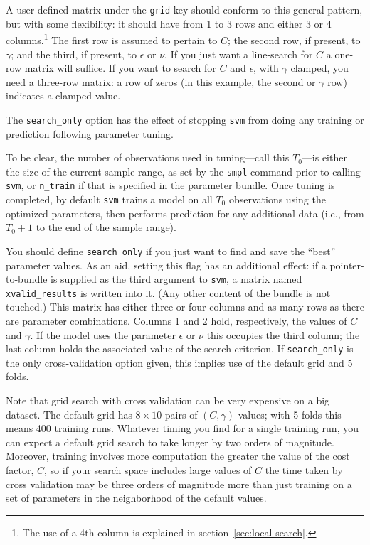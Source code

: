 \documentclass{article}
\begin{document}
A user-defined matrix under the \texttt{grid} key should conform to
this general pattern, but with some flexibility: it should have from 1
to 3 rows and either 3 or 4 columns.\footnote{The use of a 4th column
  is explained in section~\ref{sec:local-search}.} The first row is
assumed to pertain to $C$; the second row, if present, to $\gamma$;
and the third, if present, to $\epsilon$ or $\nu$. If you just want a
line-search for $C$ a one-row matrix will suffice.  If you want to
search for $C$ and $\epsilon$, with $\gamma$ clamped, you need a
three-row matrix: a row of zeros (in this example, the second or
$\gamma$ row) indicates a clamped value.

The \texttt{search\_only} option has the effect of stopping
\texttt{svm} from doing any training or prediction following parameter
tuning.

To be clear, the number of observations used in tuning---call this
$T_0$---is either the size of the current sample range, as set by the
\texttt{smpl} command prior to calling \texttt{svm}, or
\texttt{n\_train} if that is specified in the parameter bundle. Once
tuning is completed, by default \texttt{svm} trains a model on all
$T_0$ observations using the optimized parameters, then performs
prediction for any additional data (i.e., from $T_0 + 1$ to the end of
the sample range).

You should define \texttt{search\_only} if you just want to find and
save the ``best'' parameter values. As an aid, setting this flag has
an additional effect: if a pointer-to-bundle is supplied as the third
argument to \texttt{svm}, a matrix named \texttt{xvalid\_results} is
written into it. (Any other content of the bundle is not touched.)
This matrix has either three or four columns and as many rows as there
are parameter combinations. Columns 1 and 2 hold, respectively, the
values of $C$ and $\gamma$.  If the model uses the parameter
$\epsilon$ or $\nu$ this occupies the third column; the last column
holds the associated value of the search criterion.  If
\texttt{search\_only} is the only cross-validation option given, this
implies use of the default grid and 5 folds.

Note that grid search with cross validation can be very expensive on a
big dataset. The default grid has $8 \times 10$ pairs of $(C, \gamma)$
values; with 5 folds this means 400 training runs. Whatever timing you
find for a single training run, you can expect a default grid search
to take longer by two orders of magnitude. Moreover, training involves
more computation the greater the value of the cost factor, $C$, so if
your search space includes large values of $C$ the time taken by cross
validation may be three orders of magnitude more than just training on
a set of parameters in the neighborhood of the default values.
\end{document}
